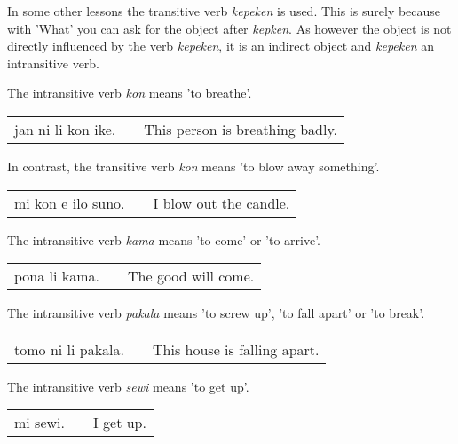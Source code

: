 In some other lessons the transitive verb \textit{kepeken} is used.
This is surely because with 'What' you can ask for the object after \textit{kepken}.
As however the object is not directly influenced by the verb \textit{kepeken}, it is an indirect object and \textit{kepeken} an intransitive verb.

%
The intransitive verb \textit{kon} means 'to breathe'.

\begin{supertabular}{p{5,5cm}|ll}
    jan ni li kon ike. &  & This person is breathing badly. \\
\end{supertabular}

In contrast, the transitive verb \textit{kon} means 'to blow away something'.

\begin{supertabular}{p{5,5cm}|ll}
    mi kon e ilo suno. &  & I blow out the candle. \\
\end{supertabular}

%
The intransitive verb \textit{kama} means 'to come' or 'to arrive'.

\begin{supertabular}{p{5,5cm}|ll}
    pona li kama. &  & The good will come. \\
\end{supertabular}

%
The intransitive verb \textit{pakala} means 'to screw up', 'to fall apart' or 'to break'.

\begin{supertabular}{p{5,5cm}|ll}
    tomo ni li pakala. &  & This house is falling apart. \\
\end{supertabular}

%
The intransitive verb \textit{sewi} means 'to get up'.

\begin{supertabular}{p{5,5cm}|ll}
    mi sewi. &  & I get up. \\
\end{supertabular}


